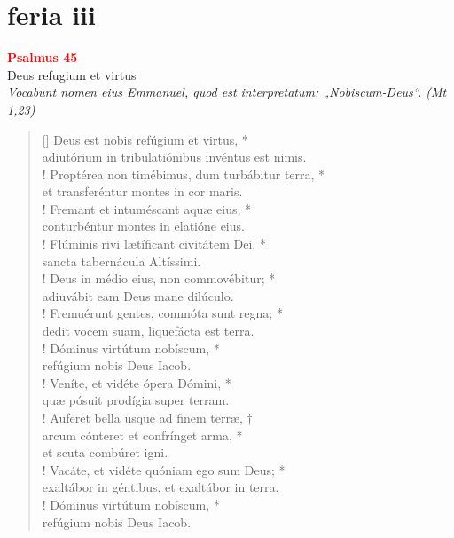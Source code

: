 \thispagestyle{plain}


\section{feria iii}



\def\greinitialformat#1{{\fontsize{40}{40}\selectfont #1}}
\gresetfirstlineaboveinitial{\small \textcolor{red}{ 1. Ant.}}{}
\setaboveinitialseparation{0.72mm}

\vspace{0.3cm}
\begin{center}
 \textcolor{red}{\large \bf Psalmus 45}\\
Deus refugium et virtus\\
\textit{\small Vocabunt nomen eius Emmanuel, quod est interpretatum: „Nobiscum-Deus“. (Mt 1,23)}
\end{center}
\begin{verse}[\versewidth]
Deus est nobis refúgium et virtus, *\\
adiutórium in tribulatiónibus invéntus est nimis.\\!
\vin Proptérea non timébimus, dum turbábitur terra, *\\
\vin et transferéntur montes in cor maris.\\!
Fremant et intuméscant aquæ eius, *\\
conturbéntur montes in elatióne eius.\\!
\vin Flúminis rivi lætíficant civitátem Dei, *\\
\vin sancta tabernácula Altíssimi.\\!
Deus in médio eius, non commovébitur; *\\
adiuvábit eam Deus mane dilúculo.\\!
\vin Fremuérunt gentes, commóta sunt regna; *\\
\vin dedit vocem suam, liquefácta est terra.\\!
Dóminus virtútum nobíscum, *\\
refúgium nobis Deus Iacob.\\!
\vin Veníte, et vidéte ópera Dómini, *\\
\vin quæ pósuit prodígia super terram.\\!
Auferet bella usque ad finem terræ, †\\
arcum cónteret et confrínget arma, *\\
et scuta combúret igni.\\!
\vin Vacáte, et vidéte quóniam ego sum Deus; *\\
\vin exaltábor in géntibus, et exaltábor in terra.\\!
Dóminus virtútum nobíscum, *\\
refúgium nobis Deus Iacob.\\
\end{verse}

